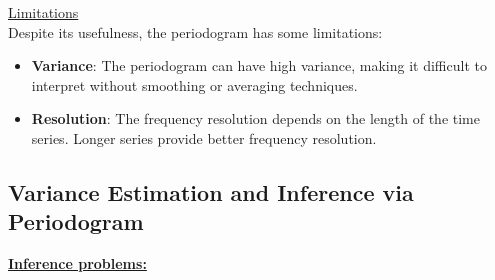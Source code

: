 \underline{Limitations}\\

Despite its usefulness, the periodogram has some limitations:

\begin{itemize}
    \item \textbf{Variance}: The periodogram can have high variance, making it difficult to interpret without smoothing or averaging techniques.
    \item \textbf{Resolution}: The frequency resolution depends on the length of the time series. Longer series provide better frequency resolution.
\end{itemize}







\subsection{Variance Estimation and Inference via Periodogram}

\textbf{\underline{Inference problems:}}

